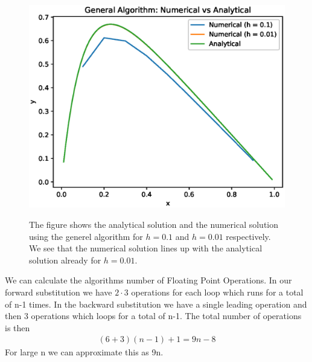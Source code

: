 \documentclass[american,a4paper,12pt]{article}
\begin{document}
\begin{figure}[H]
\begin{center}
  \includegraphics[width = \textwidth]{figures/general_algo_example.eps} \\
  \caption{The figure shows the analytical solution and the numerical solution using the generel algorithm for $h = 0.1$ and $h = 0.01$ respectively. We see that the numerical solution lines up with the analytical solution already for $h = 0.01$.}
  \label{fig:general_ex}
  \end{center}
\end{figure}
We can calculate the algorithms number of Floating Point Operations. In our forward substitution we have $2 \cdot 3$ operations for each loop which runs for a total of n-1 times. In the backward substitution we have a single leading operation and then 3 operations which loops for a total of n-1. The total number of operations is then
\begin{align*}
  (6 + 3)(n - 1) + 1 = 9n - 8
\end{align*}
For large n we can approximate this as 9n.
\end{document}
